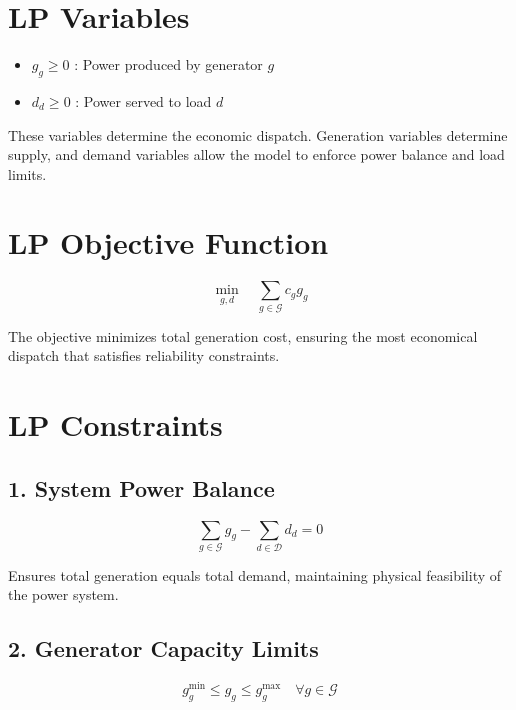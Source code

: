 \documentclass[11pt]{article}
\begin{document}
\section*{LP Variables}

\begin{itemize}[noitemsep]
    \item $g_g \ge 0$ : Power produced by generator $g$
    \item $d_d \ge 0$ : Power served to load $d$
\end{itemize}

 
These variables determine the economic dispatch. Generation variables determine supply, and demand variables allow the model to enforce power balance and load limits.

\section*{LP Objective Function}

\begin{equation}
\min_{g,d} \quad \sum_{g \in \mathcal{G}} c_g g_g
\end{equation}

 
The objective minimizes total generation cost, ensuring the most economical dispatch that satisfies reliability constraints.

\section*{LP Constraints}

\subsection*{1. System Power Balance}

\begin{equation}
\sum_{g \in \mathcal{G}} g_g
-
\sum_{d \in \mathcal{D}} d_d
= 0
\end{equation}

 
Ensures total generation equals total demand, maintaining physical feasibility of the power system.

\subsection*{2. Generator Capacity Limits}

\begin{equation}
g_g^{\min} \le g_g \le g_g^{\max}
\quad \forall g \in \mathcal{G}
\end{equation}
\end{document}
